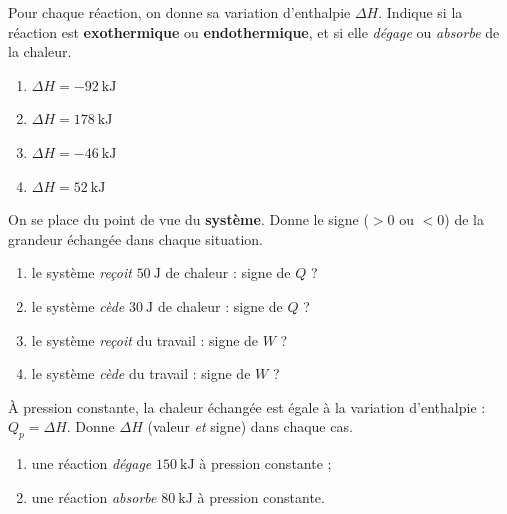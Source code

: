 \documentclass[11pt,a4paper]{article}
\begin{document}
\begin{exo}
Pour chaque réaction, on donne sa variation d'enthalpie $\Delta H$. Indique si la réaction est \textbf{exothermique} ou \textbf{endothermique}, et si elle \emph{dégage} ou \emph{absorbe} de la chaleur.
\begin{enumerate}[label=\alph*)]
  \item $\Delta H = \qty{-92}{\kilo\joule}$
  \item $\Delta H = \qty{+178}{\kilo\joule}$
  \item $\Delta H = \qty{-46}{\kilo\joule}$
  \item $\Delta H = \qty{+52}{\kilo\joule}$
\end{enumerate}
\end{exo}

\begin{exo}
On se place du point de vue du \textbf{système}. Donne le signe ($>0$ ou $<0$) de la grandeur échangée dans chaque situation.
\begin{enumerate}[label=\alph*)]
  \item le système \emph{reçoit} $\qty{50}{\joule}$ de chaleur : signe de $Q$ ?
  \item le système \emph{cède} $\qty{30}{\joule}$ de chaleur : signe de $Q$ ?
  \item le système \emph{reçoit} du travail : signe de $W$ ?
  \item le système \emph{cède} du travail : signe de $W$ ?
\end{enumerate}
\end{exo}

\begin{exo}
À pression constante, la chaleur échangée est égale à la variation d'enthalpie : $Q_p=\Delta H$. Donne $\Delta H$ (valeur \emph{et} signe) dans chaque cas.
\begin{enumerate}[label=\alph*)]
  \item une réaction \emph{dégage} $\qty{150}{\kilo\joule}$ à pression constante ;
  \item une réaction \emph{absorbe} $\qty{80}{\kilo\joule}$ à pression constante.
\end{enumerate}
\end{exo}
\end{document}
